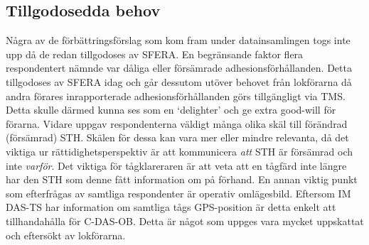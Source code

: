 \subsection{Tillgodosedda behov}
Några av de förbättringsförslag som kom fram under datainsamlingen togs inte upp då de redan tillgodoses av SFERA\@.
En begränsande faktor flera respondentert nämnde var dåliga eller försämrade adhesionsförhållanden.
Detta tillgodoses av SFERA idag och går dessutom utöver behovet från lokförarna då andra förares inrapporterade adhesionsförhållanden görs tillgängligt via TMS\@.
Detta skulle därmed kunna ses som en \lq{}delighter\rq{} och ge extra good-will för förarna.
Vidare uppgav respondenterna väldigt många olika skäl till förändrad (försämrad) STH\@.
Skälen för dessa kan vara mer eller mindre relevanta, då det viktiga ur rättidighetsperspektiv är att kommunicera \emph{att} STH är försämrad och inte \emph{varför}.
Det viktiga för tågklareraren är att veta att en tågfärd inte längre har den STH som denne fått information om på förhand.
En annan viktig punkt som efterfrågas av samtliga respondenter är operativ omlägesbild.
Eftersom IM DAS-TS har information om samtliga tågs GPS-position är detta enkelt att tillhandahålla för C-DAS-OB.
Detta är något som uppges vara mycket uppskattat och eftersökt av lokförarna.
